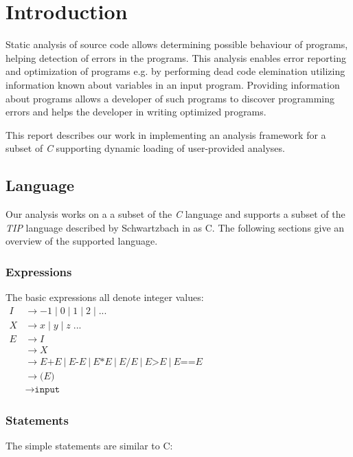 \section{Introduction}

Static analysis of source code allows determining possible behaviour of programs, helping detection of errors in the programs. This analysis enables error reporting and optimization of programs e.g. by performing dead code elemination utilizing information known about variables in an input program. Providing information about programs allows a developer of such programs to discover programming errors and helps the developer in writing optimized programs.  

\newpar This report describes our work in implementing an analysis framework for a subset of \textit{C} supporting dynamic loading of user-provided analyses. 

\subsection{Language}

\newpar Our analysis works on a a subset of the \textit{C} language and supports a subset of the \textit{TIP} language described by Schwartzbach in \cite{spa} as C. The following sections give an overview of the supported language.

\subsubsection{Expressions}
The basic expressions all denote integer values: \\

$
\begin{aligned}
    I & \rightarrow -1\;|\;0\;|\;1\;|\;2\;|\;... \\
    X & \rightarrow x\;|\;y\;|\;z\;... \\
    E & \rightarrow { I } \\
    & \rightarrow { X } \\ 
    & \rightarrow E\texttt{+}E\:|\:E\texttt{-}E\:|\:E \texttt{*} E\:|\:E \texttt{/} E\:|\:E\texttt{>}E\:|\:E\texttt{==}E \\ 
    & \rightarrow\texttt{(}E\texttt{)} \\
    & \rightarrow\texttt{input} 
\end{aligned}
$


\subsubsection{Statements}
The simple statements are similar to C: \\

